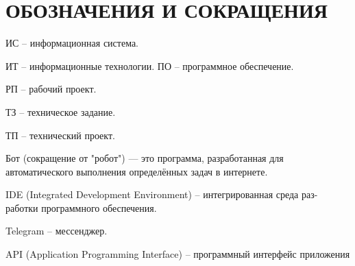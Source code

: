 \newsection
\section*{ОБОЗНАЧЕНИЯ И СОКРАЩЕНИЯ}

ИС – информационная система.

ИТ – информационные технологии. ПО – программное обеспечение.

РП – рабочий проект.

ТЗ – техническое задание.

ТП – технический проект.

Бот (сокращение от "робот") — это программа, разработанная для автоматического выполнения определённых задач в интернете.

IDE (Integrated Development Environment) – интегрированная среда раз- работки программного обеспечения.

Telegram – мессенджер.

API (Application Programming Interface) – программный интерфейс приложения
